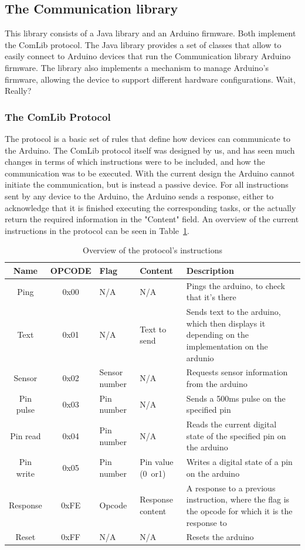 \subsection{The Communication library}
This library consists of a Java library and an Arduino firmware. Both implement the ComLib protocol.
The Java library provides a set of classes that allow to easily connect to Arduino devices that run the Communication library
Arduino firmware. The library also implements a mechanism to manage Arduino's firmware, allowing the device to support
different hardware configurations. Wait, Really?


\subsubsection{The ComLib Protocol}
The protocol is a basic set of rules that define how devices can communicate to the Arduino.
The ComLib protocol itself was designed by us, and has seen much changes in terms of which instructions were to be included,
and how the communication was to be executed. With the current design the Arduino cannot initiate the communication,
but is instead a passive device. For all instructions sent by any device to the Arduino, the Arduino sends a response,
either to acknowledge that it is finished executing the corresponding tasks, or the actually return the required
information in the "Content" field. An overview of the current instructions in the protocol can be seen in Table~\ref{tbl:opcodes}.

\begin{table}[h!]
\begin{tabular}{ | c | c | p{1.5cm} | p{1.7cm} | p{6cm} |}
\hline
\textbf{Name} & \textbf{OPCODE} & \textbf{Flag} & \textbf{Content} & \textbf{Description} \\
\hline
Ping & 0x00 & N/A & N/A & Pings the arduino, to check that it's there \\
\hline
Text & 0x01 & N/A & Text to send & Sends text to the arduino, which then displays it depending on the implementation on the ardunio \\
\hline
Sensor & 0x02 & Sensor number & N/A & Requests sensor information from the arduino \\
\hline
Pin pulse & 0x03 & Pin number & N/A & Sends a 500ms pulse on the specified pin \\
\hline
Pin read & 0x04 & Pin number & N/A & Reads the current digital state of the specified pin on the arduino \\
\hline
Pin write & 0x05 & Pin number & Pin value (0~or1) & Writes a digital state of a pin on the arduino \\
\hline
Response & 0xFE & Opcode & Response content & A response to a previous instruction, where the flag is the opcode for which it is the response to \\
\hline
Reset & 0xFF & N/A & N/A & Resets the arduino \\
\hline
\end{tabular}
\caption{Overview of the protocol's instructions}
\label{tbl:opcodes}
\end{table}

